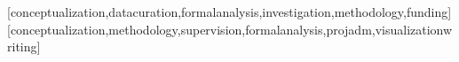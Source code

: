 \documentclass[portuguese]{textolivre}
\begin{document}
\begin{polyabstract}
\begin{english}
\begin{abstract}
\end{abstract}
\end{english}
\end{polyabstract}









\printbibliography\label{sec-bib}
\begin{contributors}
[conceptualization,datacuration,formalanalysis,investigation,methodology,funding]
[conceptualization,methodology,supervision,formalanalysis,projadm,visualizationwriting]
\end{contributors}
\end{document}
